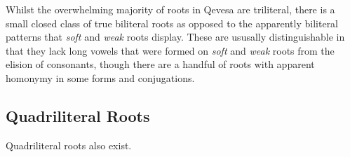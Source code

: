 \documentclass[grammar]{subfiles}
\begin{document}
Whilst the overwhelming majority of roots in Qevesa are triliteral, there is a
small closed class of true biliteral roots as opposed to the apparently
biliteral patterns that \emph{soft} and \emph{weak} roots display.  These are
ususally distinguishable in that they lack long vowels that were formed on
\emph{soft} and \emph{weak} roots from the elision of consonants, though there
are a handful of roots with apparent homonymy in some forms and conjugations.

\subsection{Quadriliteral Roots}
\label{ssec:vm_quadriliteral_roots}

Quadriliteral roots also exist.

\ToBeWritten
\end{document}
